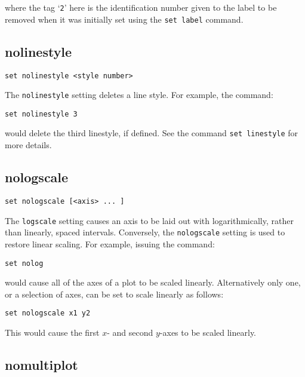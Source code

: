 \documentclass[a4paper,onecolumn,11pt]{book}
\begin{document}
\noindent where the tag `{\tt 2}' here is the identification number given to
the label to be removed when it was initially set using the {\tt set label}
command.

\subsection{nolinestyle}

\begin{verbatim}
set nolinestyle <style number>
\end{verbatim}

The {\tt nolinestyle} setting deletes a line style. For example, the command:

\begin{verbatim}
set nolinestyle 3
\end{verbatim}

\noindent would delete the third linestyle, if defined. See the command {\tt set
linestyle} for more details.


\subsection{nologscale}

\begin{verbatim}
set nologscale [<axis> ... ]
\end{verbatim}

The {\tt logscale} setting causes an axis to be laid out with logarithmically,
rather than linearly, spaced intervals. Conversely, the {\tt nologscale} setting
is used to restore linear scaling. For example, issuing the command:

\begin{verbatim}
set nolog 
\end{verbatim}

\noindent would cause all of the axes of a plot to be scaled linearly. Alternatively only one,
or a selection of axes, can be set to scale linearly as follows:

\begin{verbatim}
set nologscale x1 y2
\end{verbatim}

This would cause the first $x$- and second $y$-axes to be scaled linearly.


\subsection{nomultiplot}
\end{document}
